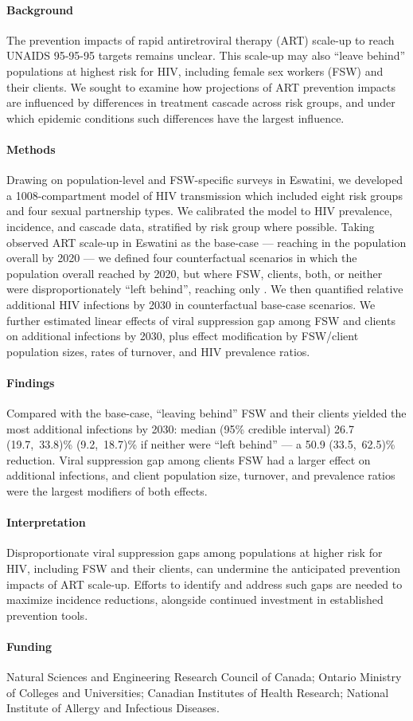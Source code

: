 \paragraph{Background}
The prevention impacts of rapid antiretroviral therapy (ART) scale-up
to reach UNAIDS 95-95-95 targets remains unclear.
This scale-up may also ``leave behind'' populations at highest risk for HIV,
including female sex workers (FSW) and their clients.
We sought to examine
how projections of ART prevention impacts are influenced by
differences in treatment cascade across risk groups, and
under which epidemic conditions such differences have the largest influence.
\paragraph{Methods}
Drawing on population-level and FSW-specific surveys in Eswatini,
we developed a 1008-compartment model of HIV transmission
which included eight risk groups and four sexual partnership types.
We calibrated the model to HIV prevalence, incidence, and cascade data,
stratified by risk group where possible.
Taking observed ART scale-up in Eswatini as the base-case
--- reaching \cashi in the population overall by 2020 ---
we defined four counterfactual scenarios in which
the population overall reached \casmd by 2020,
but where FSW, clients, both, or neither
were disproportionately ``left behind'', reaching only \caslo.
We then quantified relative additional HIV infections by 2030
in counterfactual \vs base-case scenarios.
We further estimated linear effects of
viral suppression gap among FSW and clients on additional infections by 2030, plus
effect modification by FSW/client population sizes, rates of turnover, and HIV prevalence ratios.
\paragraph{Findings}
Compared with the base-case, ``leaving behind'' FSW and their clients
yielded the most additional infections by 2030: median (95\% credible interval)
26.7 (19.7,~33.8)\%  (9.2,~18.7)\% if neither were ``left behind''
--- a 50.9 (33.5,~62.5)\% reduction.
Viral suppression gap among clients \vs FSW had a larger effect on additional infections, and
client population size, turnover, and prevalence ratios were the largest modifiers of both effects.
\paragraph{Interpretation}
Disproportionate viral suppression gaps among populations at higher risk for HIV,
including FSW and their clients,
can undermine the anticipated prevention impacts of ART scale-up.
Efforts to identify and address such gaps are needed to maximize incidence reductions,
alongside continued investment in established prevention tools.
\paragraph{Funding}
Natural Sciences and Engineering Research Council of Canada;
Ontario Ministry of Colleges and Universities;
Canadian Institutes of Health Research;
National Institute of Allergy and Infectious Diseases.
